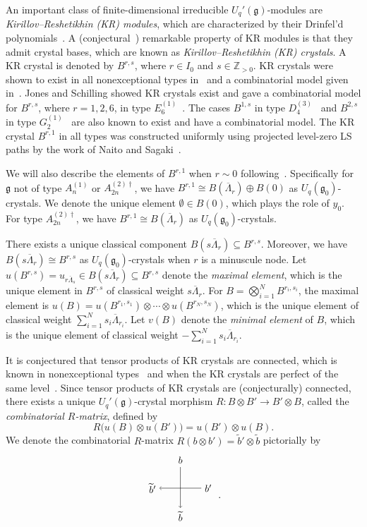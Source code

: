 \documentclass[reqno]{amsart}
\newcommand{\g}{\mathfrak{g}}
\newcommand{\clfw}{\overline{\Lambda}} %
\newcommand{\iso}{\cong}
\newcommand{\ZZ}{\mathbb{Z}}
\newcommand{\defn}[1]{{\color{darkred}\emph{#1}}} %
\theoremstyle{plain}
\theoremstyle{definition}
\numberwithin{equation}{section}
\begin{document}
An important class of finite-dimensional irreducible $U_q'(\g)$-modules are \defn{Kirillov--Reshetikhin (KR) modules}, which are characterized by their Drinfel'd polynomials~\cite{CP95, CP98}.
A (conjectural~\cite{HKOTY99, HKOTT02}) remarkable property of KR modules is that they admit crystal bases, which are known as \defn{Kirillov--Reshetikhin (KR) crystals}.
A KR crystal is denoted by $B^{r, s}$, where $r \in I_0$ and $s \in \ZZ_{>0}$.
KR crystals were shown to exist in all nonexceptional types in~\cite{OS08} and a combinatorial model given in~\cite{FOS09}.
Jones and Schilling showed KR crystals exist and gave a combinatorial model for $B^{r,s}$, where $r = 1, 2, 6$, in type $E_6^{(1)}$~\cite{JS10}.
The cases $B^{1,s}$ in type $D_4^{(3)}$~\cite{KMOY07} and $B^{2,s}$ in type $G_2^{(1)}$~\cite{Yamane98} are also known to exist and have a combinatorial model.
The KR crystal $B^{r,1}$ in all types was constructed uniformly using projected level-zero LS paths by the work of Naito and Sagaki~\cite{NS08II, NS08}.

We will also describe the elements of $B^{r,1}$ when $r \sim 0$ following~\cite{BFKL06}.
Specifically for $\g$ not of type $A_n^{(1)}$ or $A_{2n}^{(2)\dagger}$, we have $B^{r,1} \iso B(\clfw_r) \oplus B(0)$ as $U_q(\g_0)$-crystals.
We denote the unique element $\emptyset \in B(0)$, which plays the role of $y_0$.
For type $A_{2n}^{(2)\dagger}$, we have $B^{r,1} \iso B(\clfw_r)$ as $U_q(\g_0)$-crystals.

There exists a unique classical component $B(s\clfw_r) \subseteq B^{r,s}$.
Moreover, we have $B(s\clfw_r) \iso B^{r,s}$ as $U_q(\g_0)$-crystals when $r$ is a minuscule node.
Let $u(B^{r,s}) = u_{r\clfw_s} \in B(s\clfw_r) \subseteq B^{r,s}$ denote the \defn{maximal element}, which is the unique element in $B^{r,s}$ of classical weight $s \clfw_r$.
For $B = \bigotimes_{i=1}^N B^{r_i, s_i}$, the maximal element is $u(B) = u(B^{r_1,s_1}) \otimes \cdots \otimes u(B^{r_N,s_N})$, which is the unique element of classical weight $\sum_{i=1}^N s_i \clfw_{r_i}$.
Let $v(B)$ denote the \defn{minimal element} of $B$, which is the unique element of classical weight $-\sum_{i=1}^N s_i \clfw_{r_i}$.

It is conjectured that tensor products of KR crystals are connected, which is known in nonexceptional types~\cite{Okado13} and when the KR crystals are perfect of the same level~\cite{FSS07, ST12}.
Since tensor products of KR crystals are (conjecturally) connected, there exists a unique $U_q'(\g)$-crystal morphism $R \colon B \otimes B' \to B' \otimes B$, called the \defn{combinatorial $R$-matrix}, defined by
\[
R\bigl(u(B) \otimes u(B')\bigr) = u(B') \otimes u(B).
\]
We denote the combinatorial $R$-matrix $R(b \otimes b') = \widetilde{b}' \otimes \widetilde{b}$ pictorially by
\[
\begin{tikzpicture}[baseline=-10]
\node (bp) at (1,0) {$b'$};
\node (b) at (0,1) {$b$};
\node (bt) at (0,-1) {$\widetilde{b}$};
\node (btp) at (-1,0) {$\widetilde{b}'$};
\draw[->] (b) -- (bt);
\draw[->] (bp) -- (btp);
\end{tikzpicture}\ .
\]
\end{document}
